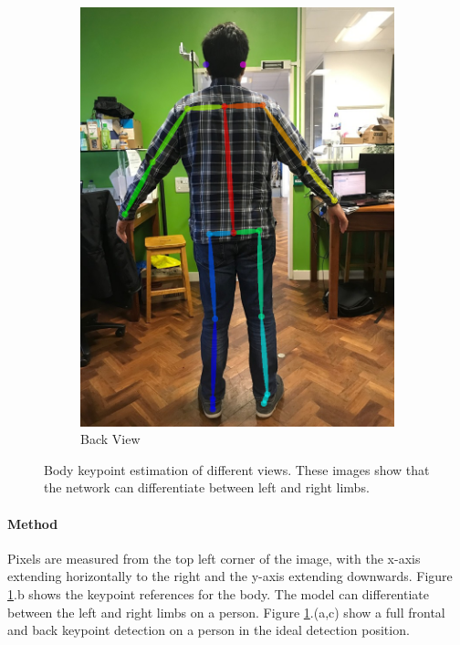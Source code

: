 \begin{figure}[ht]
\begin{subfigure}[b]{.32\textwidth}
        \includegraphics[width=1.0\linewidth]{img/chapter5_implementation/shreyBack.png}
        \caption{Back View}
    \end{subfigure}
    \vspace{-1\baselineskip}
    \begin{center}
        \caption{Body keypoint estimation of different views. These images show that the network can differentiate between left and right limbs.}
        \label{fig:keypointShrey}
    \end{center}
    \vspace{-2\baselineskip}
\end{figure}

\paragraph{Method} Pixels are measured from the top left corner of the image, with the x-axis extending horizontally to the right and the y-axis extending downwards. Figure \ref{fig:keypointShrey}.b shows the keypoint references for the body. The model can differentiate between the left and right limbs on a person. Figure \ref{fig:keypointShrey}.(a,c) show a full frontal and back keypoint detection on a person in the ideal detection position. 

